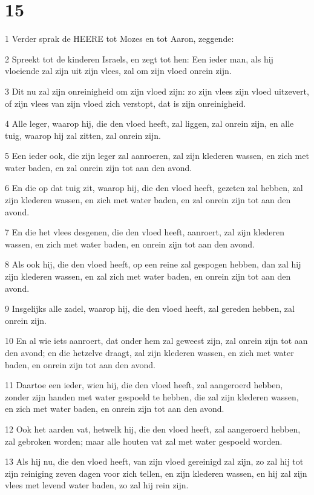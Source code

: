 \chapter{15}

\par 1 Verder sprak de HEERE tot Mozes en tot Aaron, zeggende:
\par 2 Spreekt tot de kinderen Israels, en zegt tot hen: Een ieder man, als hij vloeiende zal zijn uit zijn vlees, zal om zijn vloed onrein zijn.
\par 3 Dit nu zal zijn onreinigheid om zijn vloed zijn: zo zijn vlees zijn vloed uitzevert, of zijn vlees van zijn vloed zich verstopt, dat is zijn onreinigheid.
\par 4 Alle leger, waarop hij, die den vloed heeft, zal liggen, zal onrein zijn, en alle tuig, waarop hij zal zitten, zal onrein zijn.
\par 5 Een ieder ook, die zijn leger zal aanroeren, zal zijn klederen wassen, en zich met water baden, en zal onrein zijn tot aan den avond.
\par 6 En die op dat tuig zit, waarop hij, die den vloed heeft, gezeten zal hebben, zal zijn klederen wassen, en zich met water baden, en zal onrein zijn tot aan den avond.
\par 7 En die het vlees desgenen, die den vloed heeft, aanroert, zal zijn klederen wassen, en zich met water baden, en onrein zijn tot aan den avond.
\par 8 Als ook hij, die den vloed heeft, op een reine zal gespogen hebben, dan zal hij zijn klederen wassen, en zal zich met water baden, en onrein zijn tot aan den avond.
\par 9 Insgelijks alle zadel, waarop hij, die den vloed heeft, zal gereden hebben, zal onrein zijn.
\par 10 En al wie iets aanroert, dat onder hem zal geweest zijn, zal onrein zijn tot aan den avond; en die hetzelve draagt, zal zijn klederen wassen, en zich met water baden, en onrein zijn tot aan den avond.
\par 11 Daartoe een ieder, wien hij, die den vloed heeft, zal aangeroerd hebben, zonder zijn handen met water gespoeld te hebben, die zal zijn klederen wassen, en zich met water baden, en onrein zijn tot aan den avond.
\par 12 Ook het aarden vat, hetwelk hij, die den vloed heeft, zal aangeroerd hebben, zal gebroken worden; maar alle houten vat zal met water gespoeld worden.
\par 13 Als hij nu, die den vloed heeft, van zijn vloed gereinigd zal zijn, zo zal hij tot zijn reiniging zeven dagen voor zich tellen, en zijn klederen wassen, en hij zal zijn vlees met levend water baden, zo zal hij rein zijn.

